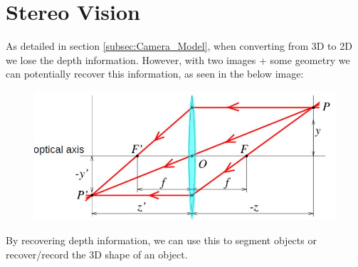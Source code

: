 \section{Stereo Vision}
As detailed in section \ref{subsec:Camera_Model}, when converting from 3D to 2D we lose the depth information. However, with two images + some geometry we can potentially recover this information, as seen in the below image: 
\begin{figure}[H]
    \centering
    \includegraphics[width = \textwidth]{Images/Thin_Lens_Diagram} %
\end{figure}
By recovering depth information, we can use this to segment objects or recover/record the 3D shape of an object. 


